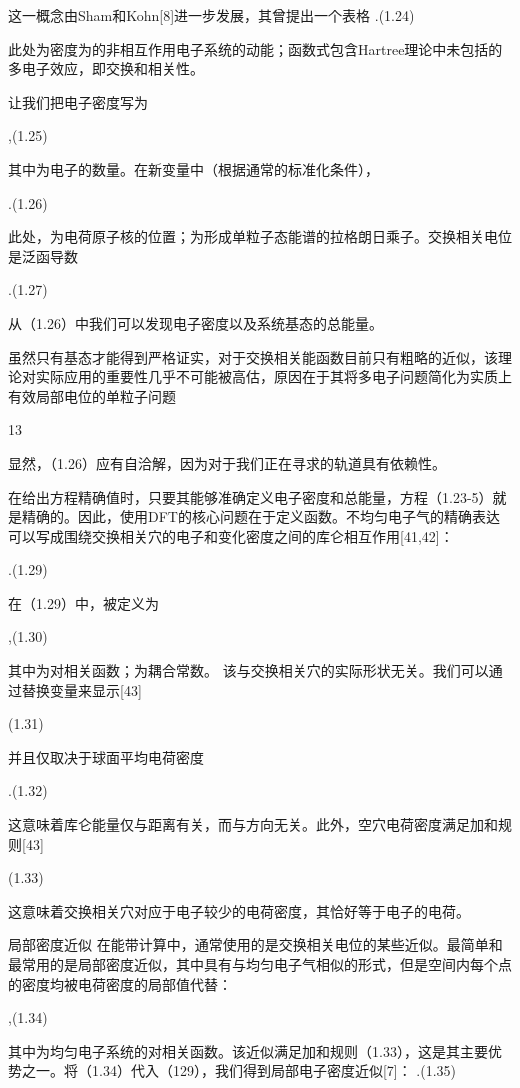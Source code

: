 这一概念由Sham和Kohn[8]进一步发展，其曾提出一个表格
.(1.24)

此处为密度为的非相互作用电子系统的动能；函数式包含Hartree理论中未包括的多电子效应，即交换和相关性。

让我们把电子密度写为

,(1.25)

其中为电子的数量。在新变量中（根据通常的标准化条件），

.(1.26)

此处，为电荷原子核的位置；为形成单粒子态能谱的拉格朗日乘子。交换相关电位是泛函导数

.(1.27)

从（1.26）中我们可以发现电子密度以及系统基态的总能量。

虽然只有基态才能得到严格证实，对于交换相关能函数目前只有粗略的近似，该理论对实际应用的重要性几乎不可能被高估，原因在于其将多电子问题简化为实质上有效局部电位的单粒子问题



13


显然，（1.26）应有自洽解，因为对于我们正在寻求的轨道具有依赖性。

在给出方程精确值时，只要其能够准确定义电子密度和总能量，方程（1.23-5）就是精确的。因此，使用DFT的核心问题在于定义函数。不均匀电子气的精确表达可以写成围绕交换相关穴的电子和变化密度之间的库仑相互作用[41,42]：

.(1.29)

在（1.29）中，被定义为

,(1.30)

其中为对相关函数；为耦合常数。
该与交换相关穴的实际形状无关。我们可以通过替换变量来显示[43]

(1.31)

并且仅取决于球面平均电荷密度

.(1.32)

这意味着库仑能量仅与距离有关，而与方向无关。此外，空穴电荷密度满足加和规则[43]

(1.33)

这意味着交换相关穴对应于电子较少的电荷密度，其恰好等于电子的电荷。

局部密度近似  
在能带计算中，通常使用的是交换相关电位的某些近似。最简单和最常用的是局部密度近似，其中具有与均匀电子气相似的形式，但是空间内每个点的密度均被电荷密度的局部值代替：

,(1.34)

其中为均匀电子系统的对相关函数。该近似满足加和规则（1.33），这是其主要优势之一。将（1.34）代入（129），我们得到局部电子密度近似[7]：
.(1.35)

